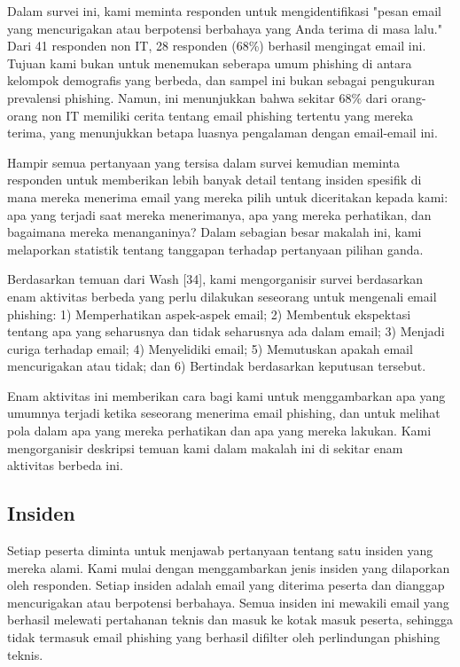 \documentclass[lettersize,journal]{IEEEtran}
\begin{document}
Dalam survei ini, kami meminta responden untuk mengidentifikasi "pesan email
yang mencurigakan atau berpotensi berbahaya yang Anda terima di masa lalu." 
Dari 41 responden non IT, 28 responden (68\%) berhasil mengingat email ini.
Tujuan kami bukan untuk menemukan seberapa umum phishing di antara kelompok 
demografis yang berbeda, dan sampel
ini bukan sebagai pengukuran prevalensi phishing. Namun, ini
menunjukkan bahwa sekitar 68\% dari orang-orang non IT memiliki cerita
tentang email phishing tertentu yang mereka terima,
yang menunjukkan betapa luasnya pengalaman dengan email-email ini.

Hampir semua pertanyaan yang tersisa dalam survei kemudian meminta responden
untuk memberikan lebih banyak detail tentang insiden spesifik di mana mereka
menerima email yang mereka pilih untuk diceritakan kepada kami: apa yang
terjadi saat mereka menerimanya, apa yang mereka perhatikan, dan bagaimana
mereka menanganinya? Dalam sebagian besar makalah ini, kami melaporkan
statistik tentang tanggapan terhadap pertanyaan pilihan ganda.

Berdasarkan temuan dari Wash [34], kami mengorganisir survei berdasarkan enam
aktivitas berbeda yang perlu dilakukan seseorang untuk mengenali email
phishing: 1) Memperhatikan aspek-aspek email; 2) Membentuk ekspektasi tentang
apa yang seharusnya dan tidak seharusnya ada dalam email; 3) Menjadi curiga
terhadap email; 4) Menyelidiki email; 5) Memutuskan apakah email mencurigakan
atau tidak; dan 6) Bertindak berdasarkan keputusan tersebut.

Enam aktivitas ini memberikan cara bagi kami untuk menggambarkan apa yang
umumnya terjadi ketika seseorang menerima email phishing, dan untuk melihat
pola dalam apa yang mereka perhatikan dan apa yang mereka lakukan. Kami
mengorganisir deskripsi temuan kami dalam makalah ini di sekitar enam aktivitas
berbeda ini.

\subsection{Insiden}

Setiap peserta diminta untuk menjawab pertanyaan tentang satu insiden yang
mereka alami. Kami mulai dengan menggambarkan jenis insiden yang dilaporkan
oleh responden. Setiap insiden adalah email yang diterima peserta dan dianggap
mencurigakan atau berpotensi berbahaya. Semua insiden ini mewakili email yang
berhasil melewati pertahanan teknis dan masuk ke kotak masuk peserta, sehingga
tidak termasuk email phishing yang berhasil difilter oleh perlindungan phishing
teknis.
\end{document}
